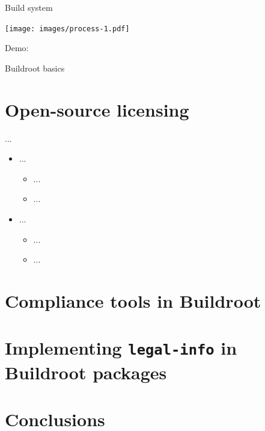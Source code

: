 \documentclass[xetex,table]{beamer}
\begin{document}
\begin{frame}{Build system}
  \begin{center}
    \texttt{[image: images/process-1.pdf]}
  \end{center}
\end{frame}

\begin{frame}[standout]
  Demo:

  Buildroot basics
\end{frame}


\section{Open-source licensing}

\begin{frame}{...}
  \begin{itemize}
  \item ...
    \begin{itemize}
    \item ...
    \item ...
    \end{itemize}
  \item ...
    \begin{itemize}
    \item ...
    \item ...
    \end{itemize}
  \end{itemize}
\end{frame}


\section{Compliance tools in Buildroot}


\section[Implementing {\tt legal-info}\\in Buildroot packages]
        {Implementing {\tt legal-info}  in Buildroot packages}


\section{Conclusions}
\end{document}

